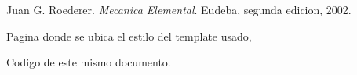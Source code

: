 \documentclass[fleqn,10pt]{SelfArx} %
\begin{document}

\begin{thebibliography}{9}
Juan G. Roederer. 
\textit{Mecanica Elemental}. 
Eudeba, segunda edicion, 2002.

Pagina donde se ubica el estilo del template usado,
\\\href{http://www.latextemplates.com/}{\color{B}{Latex Template}}

 Codigo de este mismo documento.
\\\href{https://github.com/remusezequiel/Apuntes-Varios-Propios/tree/master/Tarea_2}{\color{B}{Repo Git}}
\end{thebibliography}
\end{document}
